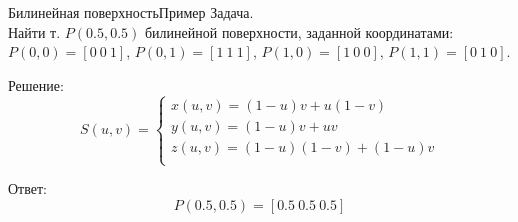 \documentclass{beamer}
\begin{document}
	\begin{frame}{Билинейная поверхность}{Пример}
		Задача. \\ Найти т. $P(0.5,0.5)$ билинейной поверхности, заданной координатами: \\
		$P(0,0)=[0~0~1]$,
		$P(0,1)=[1~1~1]$,
		$P(1,0)=[1~0~0]$,
		$P(1,1)=[0~1~0]$.

		Решение:
		\[
			S(u,v) =
			\begin{cases}
				x(u,v) = (1-u)v + u(1-v) \\
				y(u,v) = (1-u)v + uv \\
				z(u,v) = (1-u)(1-v) + (1-u)v \\
			\end{cases}
		\]

		Ответ:
		\[
			P(0.5,0.5) = [0.5~0.5~0.5]
			\]



	\end{frame}
\end{document}
